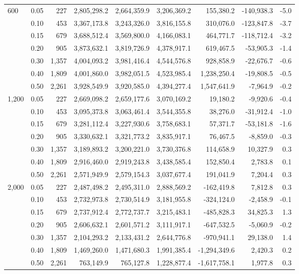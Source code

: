 \begin{table}[htbp]
\begin{adjustbox}{max width=\linewidth}
\begin{tabular}{llrrrrrrr}
\cline{1-9}
\multirow[t]{7}{*}{600} & 0.05 & 227 & 2,805,298.2 & 2,664,359.9 & 3,206,369.2 & 155,380.2 & -140,938.3 & -5.0 \\
 & 0.10 & 453 & 3,367,173.8 & 3,243,326.0 & 3,816,155.8 & 310,076.0 & -123,847.8 & -3.7 \\
 & 0.15 & 679 & 3,688,512.4 & 3,569,800.0 & 4,166,083.1 & 464,771.7 & -118,712.4 & -3.2 \\
 & 0.20 & 905 & 3,873,632.1 & 3,819,726.9 & 4,378,917.1 & 619,467.5 & -53,905.3 & -1.4 \\
 & 0.30 & 1,357 & 4,004,093.2 & 3,981,416.4 & 4,544,576.8 & 928,858.9 & -22,676.7 & -0.6 \\
 & 0.40 & 1,809 & 4,001,860.0 & 3,982,051.5 & 4,523,985.4 & 1,238,250.4 & -19,808.5 & -0.5 \\
 & 0.50 & 2,261 & 3,928,549.9 & 3,920,585.0 & 4,394,277.4 & 1,547,641.9 & -7,964.9 & -0.2 \\
\cline{1-9}
\multirow[t]{7}{*}{1,200} & 0.05 & 227 & 2,669,098.2 & 2,659,177.6 & 3,070,169.2 & 19,180.2 & -9,920.6 & -0.4 \\
 & 0.10 & 453 & 3,095,373.8 & 3,063,461.4 & 3,544,355.8 & 38,276.0 & -31,912.4 & -1.0 \\
 & 0.15 & 679 & 3,281,112.4 & 3,227,930.6 & 3,758,683.1 & 57,371.7 & -53,181.8 & -1.6 \\
 & 0.20 & 905 & 3,330,632.1 & 3,321,773.2 & 3,835,917.1 & 76,467.5 & -8,859.0 & -0.3 \\
 & 0.30 & 1,357 & 3,189,893.2 & 3,200,221.0 & 3,730,376.8 & 114,658.9 & 10,327.9 & 0.3 \\
 & 0.40 & 1,809 & 2,916,460.0 & 2,919,243.8 & 3,438,585.4 & 152,850.4 & 2,783.8 & 0.1 \\
 & 0.50 & 2,261 & 2,571,949.9 & 2,579,154.3 & 3,037,677.4 & 191,041.9 & 7,204.4 & 0.3 \\
\cline{1-9}
\multirow[t]{7}{*}{2,000} & 0.05 & 227 & 2,487,498.2 & 2,495,311.0 & 2,888,569.2 & -162,419.8 & 7,812.8 & 0.3 \\
 & 0.10 & 453 & 2,732,973.8 & 2,730,514.9 & 3,181,955.8 & -324,124.0 & -2,458.9 & -0.1 \\
 & 0.15 & 679 & 2,737,912.4 & 2,772,737.7 & 3,215,483.1 & -485,828.3 & 34,825.3 & 1.3 \\
 & 0.20 & 905 & 2,606,632.1 & 2,601,571.2 & 3,111,917.1 & -647,532.5 & -5,060.9 & -0.2 \\
 & 0.30 & 1,357 & 2,104,293.2 & 2,133,431.2 & 2,644,776.8 & -970,941.1 & 29,138.0 & 1.4 \\
 & 0.40 & 1,809 & 1,469,260.0 & 1,471,680.3 & 1,991,385.4 & -1,294,349.6 & 2,420.3 & 0.2 \\
 & 0.50 & 2,261 & 763,149.9 & 765,127.8 & 1,228,877.4 & -1,617,758.1 & 1,977.8 & 0.3 \\
\cline{1-9}
\bottomrule
\end{tabular}
\end{adjustbox}
\end{table}
